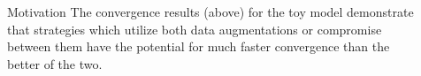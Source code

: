 \documentclass[final]{beamer}
\newlength{\sepwid}
\newlength{\onecolwid}
\newlength{\twocolwid}
\begin{document}
\begin{frame}[t]
\begin{columns}[t]
\begin{column}{\onecolwid}
\begin{block}{Motivation}
The convergence results (above) for the toy model demonstrate that strategies which utilize both data augmentations or compromise between them have the potential for much faster convergence than the better of the two.

\end{block}




\end{column} %

\begin{column}{\sepwid}\end{column} %

\begin{column}{\twocolwid} %


\end{column}
\end{columns}
\end{frame}
\end{document}
